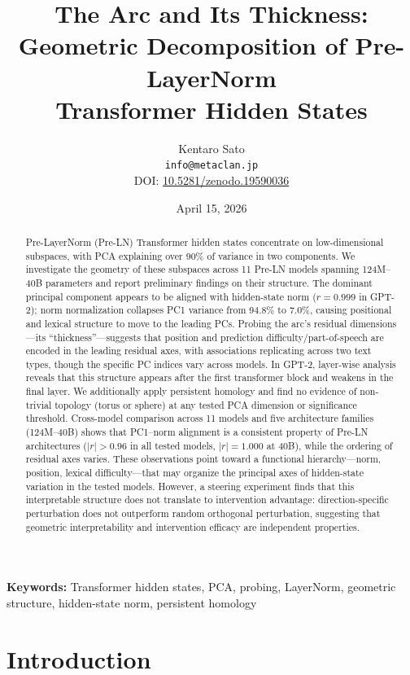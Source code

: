 \documentclass[11pt,a4paper]{article}
\title{The Arc and Its Thickness:\\Geometric Decomposition of Pre-LayerNorm\\Transformer Hidden States}
\author{
    Kentaro Sato\\
    \texttt{info@metaclan.jp}\\[0.5em]
    \small DOI: \href{https://doi.org/10.5281/zenodo.19590036}{10.5281/zenodo.19590036}
}
\date{April 15, 2026}
\begin{document}
\maketitle

\begin{abstract}
Pre-LayerNorm (Pre-LN) Transformer hidden states concentrate on low-dimensional subspaces, with PCA explaining over 90\% of variance in two components. We investigate the geometry of these subspaces across 11 Pre-LN models spanning 124M--40B parameters and report preliminary findings on their structure. The dominant principal component appears to be aligned with hidden-state norm ($r = 0.999$ in GPT-2); norm normalization collapses PC1 variance from 94.8\% to 7.0\%, causing positional and lexical structure to move to the leading PCs. Probing the arc's residual dimensions---its ``thickness''---suggests that position and prediction difficulty/part-of-speech are encoded in the leading residual axes, with associations replicating across two text types, though the specific PC indices vary across models. In GPT-2, layer-wise analysis reveals that this structure appears after the first transformer block and weakens in the final layer. We additionally apply persistent homology and find no evidence of non-trivial topology (torus or sphere) at any tested PCA dimension or significance threshold. Cross-model comparison across 11 models and five architecture families (124M--40B) shows that PC1--norm alignment is a consistent property of Pre-LN architectures ($|r| > 0.96$ in all tested models, $|r| = 1.000$ at 40B), while the ordering of residual axes varies. These observations point toward a functional hierarchy---norm, position, lexical difficulty---that may organize the principal axes of hidden-state variation in the tested models. However, a steering experiment finds that this interpretable structure does not translate to intervention advantage: direction-specific perturbation does not outperform random orthogonal perturbation, suggesting that geometric interpretability and intervention efficacy are independent properties.
\end{abstract}

\noindent\textbf{Keywords:} Transformer hidden states, PCA, probing, LayerNorm, geometric structure, hidden-state norm, persistent homology

\section{Introduction}
\end{document}
